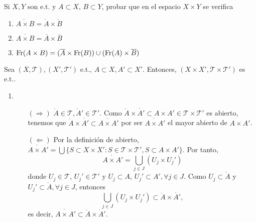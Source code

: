 \begin{ejr}[34]
  Si $X, Y$ son e.t. y $A \subset X$, $B \subset Y$, probar que en el espacio $X \times Y$ se verifica
  \begin{enumerate}[label=(\roman*)]
    \item $\mathring{A \times B} = \mathring{A} \times \mathring{B}$
    \item $\overline{A \times B} = \overline{A} \times \overline{B}$
    \item $\operatorname{Fr}({A \times B}) = (\overline{A} \times \operatorname{Fr}(B)) \cup (\operatorname{Fr}(A) \times \overline{B})$
  \end{enumerate}
\end{ejr}

\begin{sol}
Sea $( X, \mathcal{T} ), ( X', \mathcal{T}' )$ e.t., $A \subset X, A' \subset X'$. Entonces, $( X \times X', \mathcal{T} \times \mathcal{T}')$ es e.t..
  \begin{enumerate}[label=(\roman*)]
    \item \begin{enumerate}[label=(\roman*)]
      \item []
      \item [$(\Rightarrow)$] $\mathring{A} \in \mathcal{T}, \mathring{A}' \in \mathcal{T}'$. Como $\mathring{A} \times \mathring{A'} \subset A \times A' \in \mathcal{T} \times \mathcal{T}'$ es abierto, tenemos que $\mathring{A} \times \mathring{A'} \subset \mathring{A \times A'}$ por ser $\mathring{A \times A'}$ el mayor abierto de $A \times A'$.
      \item [$(\Leftarrow)$] Por la definición de abierto, $\mathring{A \times A'} = \bigcup \{ S \subset X \times X' : S \in \mathcal{T} \times \mathcal{T}', S \subset A \times A' \}$. Por tanto,
        \[
          \mathring{A \times A'} = \bigcup_{j \in J} (U_{j} \times U_{j}')
        \]
        donde $U_{j} \in \mathcal{T}$, $U_{j}' \in \mathcal{T}'$ y $U_{j} \subset A$, $U_{j}' \subset A', \forall j \in J$. Como $U_{j} \subset \mathring{A}$ y $U_{j}' \subset \mathring{A}, \forall j \in J$, entonces
        \[ 
          \bigcup_{j \in J} (U_{j} \times U_{j}') \subset \mathring{A} \times \mathring{A'},
        \] 
        es decir, $\mathring{A \times A'} \subset \mathring{A} \times \mathring{A}'$.
    \end{enumerate}


\end{enumerate}
\end{sol}
